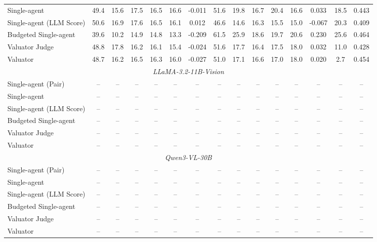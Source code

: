 \begin{table}[t]
{\begin{tabular}{lcccccccccccccc}
Single-agent              & 49.4 & 15.6 & 17.5 & 16.5 & 16.6 & -0.011 & 51.6 & 19.8 & 16.7 & 20.4 & 16.6 & 0.033 & 18.5 & 0.443 \\
Single-agent (LLM Score)  & 50.6 & 16.9 & 17.6 & 16.5 & 16.1 & 0.012 & 46.6 & 14.6 & 16.3 & 15.5 & 15.0 & -0.067 & 20.3 & 0.409 \\
Budgeted Single-agent     & 39.6 & 10.2 & 14.9 & 14.8 & 13.3 & -0.209 & 61.5 & 25.9 & 18.6 & 19.7 & 20.6 & 0.230 & 25.6 & 0.464 \\
Valuator Judge            & 48.8 & 17.8 & 16.2 & 16.1 & 15.4 & -0.024 & 51.6 & 17.7 & 16.4 & 17.5 & 18.0 & 0.032 & 11.0 & 0.428 \\
Valuator                  & 48.7 & 16.2 & 16.5 & 16.3 & 16.0 & -0.027 & 51.0 & 17.1 & 16.6 & 17.0 & 18.0 & 0.020 & 2.7 & 0.454 \\
\midrule
\multicolumn{15}{c}{\textit{LLaMA-3.2-11B-Vision}} \\ 
Single-agent (Pair)       & -- & -- & -- & -- & -- & -- & -- & -- & -- & -- & -- & -- & -- & -- \\
Single-agent              & -- & -- & -- & -- & -- & -- & -- & -- & -- & -- & -- & -- & -- & -- \\
Single-agent (LLM Score)  & -- & -- & -- & -- & -- & -- & -- & -- & -- & -- & -- & -- & -- & -- \\
Budgeted Single-agent     & -- & -- & -- & -- & -- & -- & -- & -- & -- & -- & -- & -- & -- & -- \\
Valuator Judge            & -- & -- & -- & -- & -- & -- & -- & -- & -- & -- & -- & -- & -- & -- \\
Valuator                  & -- & -- & -- & -- & -- & -- & -- & -- & -- & -- & -- & -- & -- & -- \\
\midrule
\multicolumn{15}{c}{\textit{Qwen3-VL-30B}} \\ 
Single-agent (Pair)       & -- & -- & -- & -- & -- & -- & -- & -- & -- & -- & -- & -- & -- & -- \\
Single-agent              & -- & -- & -- & -- & -- & -- & -- & -- & -- & -- & -- & -- & -- & -- \\
Single-agent (LLM Score)  & -- & -- & -- & -- & -- & -- & -- & -- & -- & -- & -- & -- & -- & -- \\
Budgeted Single-agent     & -- & -- & -- & -- & -- & -- & -- & -- & -- & -- & -- & -- & -- & -- \\
Valuator Judge            & -- & -- & -- & -- & -- & -- & -- & -- & -- & -- & -- & -- & -- & -- \\
Valuator                  & -- & -- & -- & -- & -- & -- & -- & -- & -- & -- & -- & -- & -- & -- \\

\end{tabular}}
\end{table}
